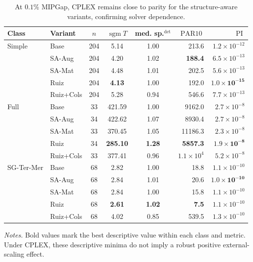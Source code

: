 \documentclass[AMA,Times1COL]{WileyNJDv5} %
\newcommand{\methodBase}{Base}
\newcommand{\methodAug}{SA-Aug}
\newcommand{\methodMat}{SA-Mat}
\newcommand{\methodRuiz}{Ruiz}
\newcommand{\methodRuizCols}{Ruiz+Cols}
\newcommand{\sgm}{\ensuremath{\operatorname{sgm}}}
\newcommand{\PARten}{\ensuremath{\operatorname{PAR10}}}
\newcommand{\PI}{\ensuremath{\operatorname{PI}}}
\providecommand{\DIFaddbegin}{} %
\providecommand{\DIFaddend}{} %
\providecommand{\DIFdelend}{} %
\begin{document}
\DIFdelend \DIFaddbegin \begin{table}[t]
\centering
\footnotesize
\caption{At $0.1\%$ MIPGap, CPLEX remains close to parity for the structure-aware variants, confirming solver dependence.}
\label{tab:robust-cplex-01pct-mipgap}
\begin{tabular}{@{}ll S[table-format=3.0] S[table-format=3.2] S[table-format=1.2] r r @{}}
\toprule
Class & Variant & {$n$} & {$\sgm T$} & {med. sp.$^{\det}$} & {\PARten{}} & {\PI{}} \\
\midrule
Simple & \methodBase & 204 & 5.14 & 1.00 & 213.6 & $1.2\times10^{-12}$ \\
 & \methodAug & 204 & 4.20 & 1.02 & \textbf{188.4} & $6.5\times10^{-13}$ \\
 & \methodMat & 204 & 4.48 & 1.01 & 202.5 & $5.6\times10^{-13}$ \\
 & \methodRuiz & 204 & \textbf{4.13} & 1.00 & 192.0 & $\mathbf{1.0\times10^{-15}}$ \\
 & \methodRuizCols & 204 & 5.28 & 0.94 & 546.6 & $7.7\times10^{-13}$ \\
\addlinespace
Full & \methodBase & 33 & 421.59 & 1.00 & 9162.0 & $2.7\times10^{-8}$ \\
 & \methodAug & 34 & 422.62 & 1.07 & 8930.4 & $2.7\times10^{-8}$ \\
 & \methodMat & 33 & 370.45 & 1.05 & 11186.3 & $2.3\times10^{-8}$ \\
 & \methodRuiz & 34 & \textbf{285.10} & \textbf{1.28} & \textbf{5857.3} & $\mathbf{1.9\times10^{-8}}$ \\
 & \methodRuizCols & 33 & 377.41 & 0.96 & $1.1\times10^{4}$ & $5.2\times10^{-8}$ \\
\addlinespace
SG-Ter-Mer & \methodBase & 68 & 2.82 & 1.00 & 18.8 & $1.1\times10^{-10}$ \\
 & \methodAug & 68 & 2.84 & 1.01 & 20.6 & $\mathbf{1.0\times10^{-10}}$ \\
 & \methodMat & 68 & 2.84 & 1.00 & 15.8 & $1.1\times10^{-10}$ \\
 & \methodRuiz & 68 & \textbf{2.61} & \textbf{1.02} & \textbf{7.5} & $1.1\times10^{-10}$ \\
 & \methodRuizCols & 68 & 4.02 & 0.85 & 539.5 & $1.3\times10^{-10}$ \\
\bottomrule
\end{tabular}
\begin{flushleft}\footnotesize
\emph{Notes.} Bold values mark the best descriptive value within each class and metric.
Under CPLEX, these descriptive minima do not imply a robust positive external-scaling
effect.
\end{flushleft}
\end{table}
\DIFaddend 
\end{document}
